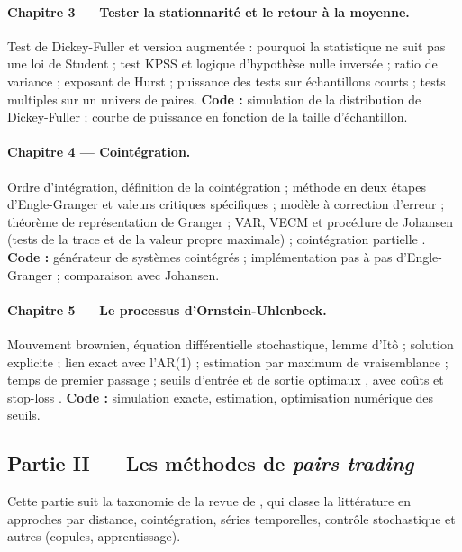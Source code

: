 \paragraph{Chapitre 3 — Tester la stationnarité et le retour à la moyenne.}
Test de Dickey-Fuller et version augmentée \citep{dickeyfuller1979} : pourquoi la statistique ne suit pas une loi de Student ; test KPSS \citep{kpss1992} et logique d'hypothèse nulle inversée ; ratio de variance \citep{lomackinlay1988} ; exposant de Hurst ; puissance des tests sur échantillons courts ; tests multiples sur un univers de paires. \textbf{Code :} simulation de la distribution de Dickey-Fuller ; courbe de puissance en fonction de la taille d'échantillon.

\paragraph{Chapitre 4 — Cointégration.}
Ordre d'intégration, définition de la cointégration ; méthode en deux étapes d'Engle-Granger et valeurs critiques spécifiques \citep{englegranger1987} ; modèle à correction d'erreur ; théorème de représentation de Granger ; VAR, VECM et procédure de Johansen (tests de la trace et de la valeur propre maximale) \citep{johansen1991} ; cointégration partielle \citep{clegg2018}. \textbf{Code :} générateur de systèmes cointégrés ; implémentation pas à pas d'Engle-Granger ; comparaison avec Johansen.

\paragraph{Chapitre 5 — Le processus d'Ornstein-Uhlenbeck.}
Mouvement brownien, équation différentielle stochastique, lemme d'Itô ; solution explicite \citep{uhlenbeck1930} ; lien exact avec l'AR(1) ; estimation par maximum de vraisemblance ; temps de premier passage ; seuils d'entrée et de sortie optimaux \citep{bertram2010}, avec coûts et stop-loss \citep{leungli2015,leungli2016}. \textbf{Code :} simulation exacte, estimation, optimisation numérique des seuils.

\subsection{Partie II — Les méthodes de \emph{pairs trading}}

Cette partie suit la taxonomie de la revue de \citet{krauss2017survey}, qui classe la littérature en approches par distance, cointégration, séries temporelles, contrôle stochastique et \og autres\fg{} (copules, apprentissage).

